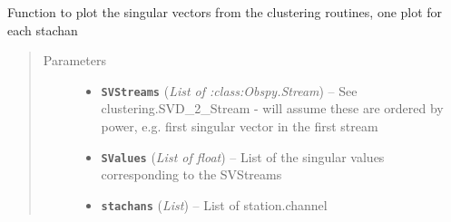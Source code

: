\documentclass[a4paper,10pt,english]{sphinxmanual}
\begin{document}
\begin{fulllineitems}
\label{utils:EQcorrscan_plotting.SVD_plot}
Function to plot the singular vectors from the clustering routines, one
plot for each stachan
\begin{quote}\begin{description}
\item[{Parameters}] \leavevmode\begin{itemize}
\item {} 
\textbf{\texttt{SVStreams}} (\emph{List of :class:Obspy.Stream}) -- See clustering.SVD\_2\_Stream - will assume these are            ordered by power, e.g. first singular vector in the first stream

\item {} 
\textbf{\texttt{SValues}} (\emph{List of float}) -- List of the singular values corresponding to the SVStreams

\item {} 
\textbf{\texttt{stachans}} (\emph{List}) -- List of station.channel

\end{itemize}

\end{description}\end{quote}

\end{fulllineitems}

\end{document}

